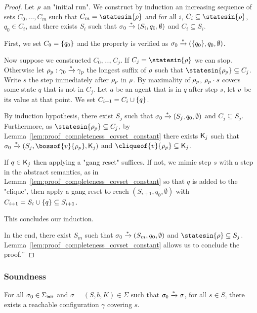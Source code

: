 \begin{proof}
	Let $\rho$ an "initial run".
	We construct by induction an increasing sequence of sets $C_0, \ldots, C_m$ such that $C_m = \statesin{\run}$ and for all $i$, $C_i \subseteq \statesin{\run}$, $q_0 \in C_i$, and there exists $S_i$ such that $\sigma_0 \xrightarrow{*} (S_i, q_0, \emptyset)$ and $C_i \subseteq S_i$. 
	
	First, we set $C_0 = \{q_0\}$ and the property is verified as $\sigma_0 \xrightarrow{*} (\{q_0\}, q_0, \emptyset)$.
	
	Now suppose we constructed $C_0, \ldots, C_j$. If $C_j = \statesin{\run}$ we can stop. Otherwise let $\rho_p: \gamma_0 \xrightarrow{*}\gamma_p$ the longest suffix of $\rho$ such that  $\statesin{\run_p} \subseteq C_j$. Write $s$ the step immediately after $\rho_p$ in $\rho$. By maximality of $\rho_p$, $\rho_p \cdot s$ covers some state $q$ that is not in $C_j$. Let $a$ be an agent that is in $q$ after step $s$, let $v$ be its value at that point. We set $C_{i+1} = C_i \cup \{q\}$.
	
	By induction hypothesis, there exist $S_{j}$ such that $\sigma_0 \xrightarrow{*} (S_{j}, q_0, \emptyset)$ and $C_j \subseteq S_{j}$. Furthermore, as $\statesin{\run_p} \subseteq C_j$, by Lemma~\ref{lem:proof_completeness_covset_constant} there exists $\mathsf{K}_j$ such that $\aconfiginit \step{*} (S_{j}, \bossof{\aval}{\run_p}, \clique_j)$ and $\cliqueof{\aval}{\run_p} \subseteq \clique_j$.
	
	If $q \in \mathsf{K}_j$ then applying a "gang reset" suffices. If not, we mimic step $s$ with a step in the abstract semantics, as in Lemma~\ref{lem:proof_completeness_covset_constant} so that $q$ is added to the "clique", then apply a gang reset to reach $(S_{i+1}, q_0, \emptyset)$ with $C_{i+1} = S_i \cup \{q\} \subseteq S_{i+1}$. 
	
	This concludes our induction.
	
	In the end, there exist $S_m$ such that $\sigma_0 \xrightarrow{*} (S_{m}, q_0, \emptyset)$ and $\statesin{\run} \subseteq S_{j}$. Lemma~\ref{lem:proof_completeness_covset_constant} allows us to conclude the proof.¨
\end{proof}


\subsubsection{Soundness}
\label{sec:one-soundness}

\begin{lemma}
	\label{cor:soundness}
	For all $\sigma_0 \in \Sigma_{\mathsf{init}}$ and $\sigma = (S, b, K) \in \Sigma$ such that $\sigma_0 \xrightarrow{*} \sigma$, for all $s \in S$, there exists a reachable configuration $\gamma$ covering $s$.
\end{lemma}


